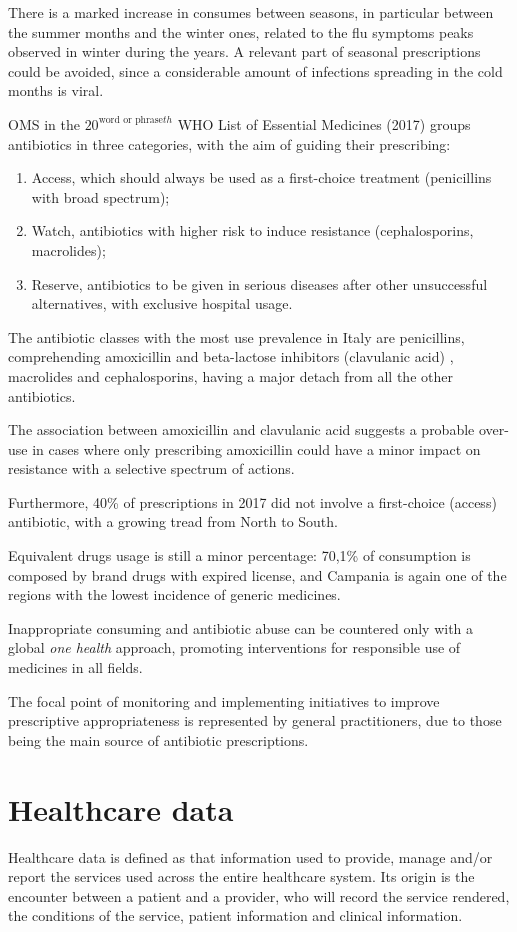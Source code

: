 There is a marked increase in consumes between seasons, in particular between the summer months and the winter ones, related to the flu symptoms peaks observed in winter during the years. A relevant part of seasonal prescriptions could be avoided, since a considerable amount of infections spreading in the cold months is viral.

OMS in the $20^{\text{word or phrase}th}$ WHO List of Essential Medicines (2017) groups antibiotics in three categories, with the aim of guiding their prescribing:
\begin{enumerate}
	\item Access, which should always be used as a first-choice treatment (penicillins with broad spectrum);
	\item Watch, antibiotics with higher risk to induce resistance (cephalosporins, macrolides);
	\item Reserve, antibiotics to be given in serious diseases after other unsuccessful alternatives, with exclusive hospital usage.
\end{enumerate}

The antibiotic classes with the most use prevalence in Italy are penicillins, comprehending amoxicillin and beta-lactose inhibitors (clavulanic acid) , macrolides and cephalosporins, having a major detach from all the other antibiotics.

The association between amoxicillin and clavulanic acid suggests a probable over-use in cases where only prescribing amoxicillin could have a minor impact on resistance with a selective spectrum of actions.

Furthermore, 40\% of prescriptions in 2017 did not involve a first-choice (access) antibiotic, with a growing tread from North to South.

Equivalent drugs usage is still a minor percentage: 70,1\% of consumption is composed by brand drugs with expired license, and Campania is again one of the regions with the lowest incidence of generic medicines.

Inappropriate consuming and antibiotic abuse can be countered only with a global \textit{one health} approach, promoting interventions for responsible use of medicines in all fields\cite{aifa2017}.

The focal point of monitoring and implementing initiatives to improve prescriptive appropriateness is represented by general practitioners, due to those being the main source of antibiotic prescriptions.

\section{Healthcare data}
Healthcare data is defined as that information used to provide, manage and/or report the services used across the entire healthcare system. Its origin is the encounter between a patient and a provider, who will record the service rendered, the conditions of the service, patient information and clinical information\cite{dataquality}.

